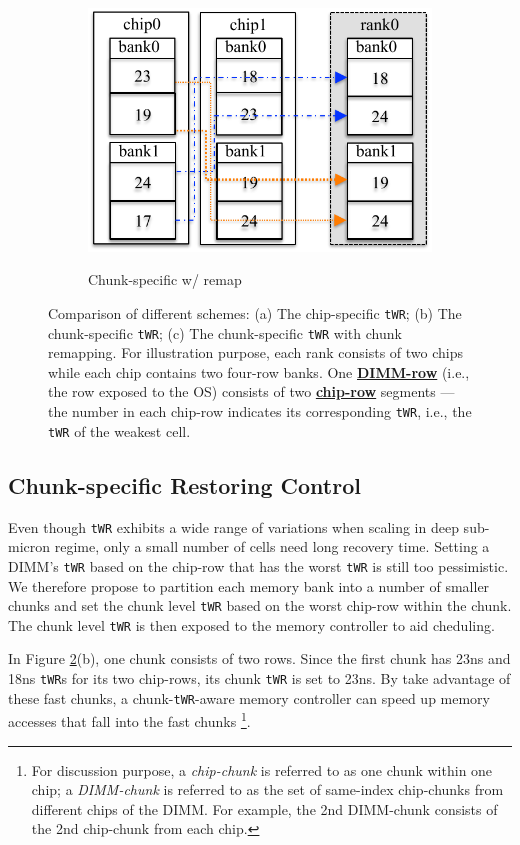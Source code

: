 \begin{figure}
\begin{subfigure}{.32\textwidth}
    	\includegraphics[width=\linewidth]{figures/chunk_sort.pdf}\\
    \caption{Chunk-specific w/ remap}
    \label{fig:chunk_sort}
  \end{subfigure}
  \vspace{-0.45in}
\caption{Comparison of different schemes: (a) The chip-specific {\tt tWR}; (b) The chunk-specific {\tt tWR}; (c) The chunk-specific {\tt tWR} with chunk remapping. For illustration purpose, each rank consists of two chips while each chip contains two four-row banks. One {\underline {\bf DIMM-row}} (i.e., the row exposed to the OS) consists of two {\underline {\bf chip-row}} segments --- the number in each chip-row indicates its corresponding {\tt tWR}, i.e., the {\tt tWR} of the weakest cell.}
\label{fig:schemes}
  \vspace{-0.45in}
\end{figure}

\subsection{Chunk-specific Restoring Control}
Even though {\tt tWR} exhibits a wide range of variations when scaling in deep sub-micron regime, only a small number of cells need long recovery time.  Setting a DIMM's {\tt tWR} based on the chip-row that has the worst {\tt tWR} is still too pessimistic.
We therefore propose to partition each memory bank into a number of smaller chunks and set the chunk level {\tt tWR} based on the worst chip-row within the chunk. 
The chunk level {\tt tWR} is then exposed to the memory controller to aid cheduling.

In Figure \ref{fig:schemes}(b), one chunk consists of two rows. Since the first chunk has 23ns and 18ns {\tt tWR}s for its two chip-rows, its chunk {\tt tWR} is set to 23ns.
By take advantage of these fast chunks, a chunk-{\tt tWR}-aware memory controller can speed up memory accesses that fall into the fast chunks
\footnote{For discussion purpose, a {\em chip-chunk} is referred to as one chunk within one chip; a {\em DIMM-chunk} is referred to as the set of same-index chip-chunks from different chips of the DIMM. For example, the 2nd DIMM-chunk consists of the 2nd chip-chunk from each chip.}.


